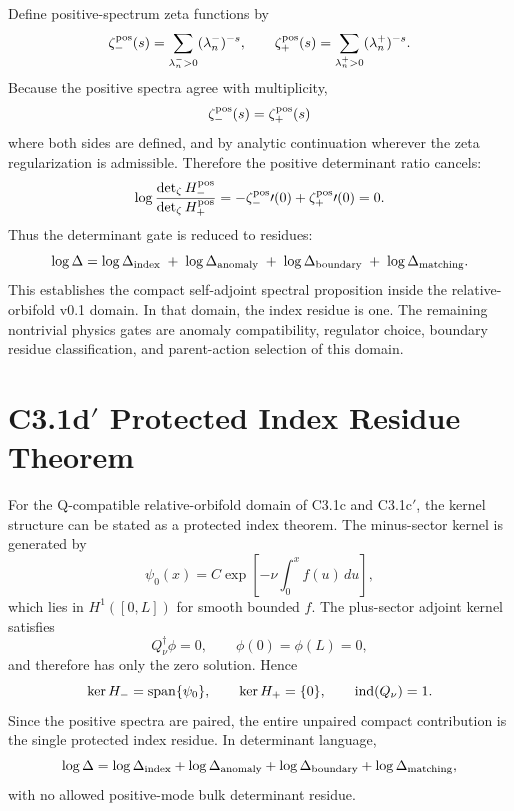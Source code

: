 \documentclass[11pt]{article}
\begin{document}
Define positive-spectrum zeta functions by
\begin{equation}
\zeta_-^{\rm pos}(s)=\sum_{\lambda_n^->0}(\lambda_n^-)^{-s},
\qquad
\zeta_+^{\rm pos}(s)=\sum_{\lambda_n^+>0}(\lambda_n^+)^{-s} .
\end{equation}
Because the positive spectra agree with multiplicity,
\begin{equation}
\zeta_-^{\rm pos}(s)=\zeta_+^{\rm pos}(s)
\end{equation}
where both sides are defined, and by analytic continuation wherever the zeta
regularization is admissible.  Therefore the positive determinant ratio
cancels:
\begin{equation}
\log\frac{\det_\zeta H_-^{\rm pos}}{\det_\zeta H_+^{\rm pos}}
=
-\zeta_-^{\rm pos}\prime(0)+\zeta_+^{\rm pos}\prime(0)=0 .
\end{equation}
Thus the determinant gate is reduced to residues:
\begin{equation}
\log\Delta
=
\log\Delta_{\rm index}
\;+\;
\log\Delta_{\rm anomaly}
\;+\;
\log\Delta_{\rm boundary}
\;+\;
\log\Delta_{\rm matching} .
\end{equation}
This establishes the compact self-adjoint spectral proposition inside the
relative-orbifold v0.1 domain.  In that domain, the index residue is one.  The
remaining nontrivial physics gates are anomaly compatibility, regulator choice,
boundary residue classification, and parent-action selection of this domain.

\section{C3.1d$'$ Protected Index Residue Theorem}
For the Q-compatible relative-orbifold domain of C3.1c and C3.1c$'$, the kernel
structure can be stated as a protected index theorem.  The minus-sector kernel
is generated by
\begin{equation}
\psi_0(x)=C\exp\left[-\nu\int_0^x f(u)\,du\right],
\end{equation}
which lies in $H^1([0,L])$ for smooth bounded $f$.  The plus-sector adjoint
kernel satisfies
\begin{equation}
Q_\nu^\dagger\phi=0,\qquad \phi(0)=\phi(L)=0,
\end{equation}
and therefore has only the zero solution.  Hence
\begin{equation}
\ker H_-=\operatorname{span}\{\psi_0\},\qquad
\ker H_+=\{0\},\qquad
{\rm ind}(Q_\nu)=1 .
\end{equation}
Since the positive spectra are paired, the entire unpaired compact contribution
is the single protected index residue.  In determinant language,
\begin{equation}
\log\Delta
=\log\Delta_{\rm index}
+\log\Delta_{\rm anomaly}
+\log\Delta_{\rm boundary}
+\log\Delta_{\rm matching},
\end{equation}
with no allowed positive-mode bulk determinant residue.
\end{document}
